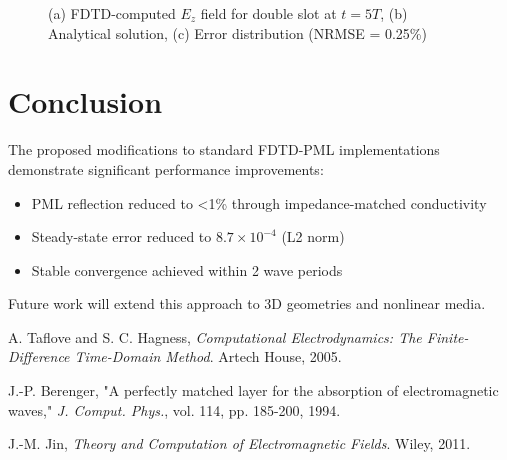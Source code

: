 \documentclass[journal]{IEEEtran}
\begin{document}
\begin{figure}[htbp]
\centering
\caption{(a) FDTD-computed $E_z$ field for double slot at $t=5T$, (b) Analytical solution, (c) Error distribution (NRMSE = 0.25\%)}
\end{figure}

\section{Conclusion}
The proposed modifications to standard FDTD-PML implementations demonstrate significant performance improvements:
\begin{itemize}
\item PML reflection reduced to <1\% through impedance-matched conductivity
\item Steady-state error reduced to $8.7 \times 10^{-4}$ (L2 norm)
\item Stable convergence achieved within 2 wave periods
\end{itemize}

Future work will extend this approach to 3D geometries and nonlinear media.



\begin{thebibliography}{9}
A. Taflove and S. C. Hagness, \emph{Computational Electrodynamics: The Finite-Difference Time-Domain Method}. Artech House, 2005.

J.-P. Berenger, "A perfectly matched layer for the absorption of electromagnetic waves," \emph{J. Comput. Phys.}, vol. 114, pp. 185-200, 1994.

J.-M. Jin, \emph{Theory and Computation of Electromagnetic Fields}. Wiley, 2011.
\end{thebibliography}
\end{document}
